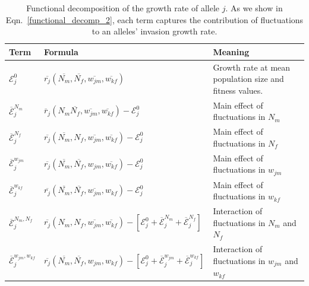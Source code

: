 \documentclass[12pt]{article}
\begin{document}
\begin{table}[h]
\fontsize{7}{12}\selectfont %
    \centering
      \caption{Functional decomposition of the growth rate of allele $j$. As we show in Eqn.~\ref{functional_decomp_2}, each term captures the contribution of fluctuations to an alleles' invasion growth rate. }
  \resizebox{\textwidth}{!} {\begin{tabular}{l|l|l}
  \toprule
        Term & Formula & Meaning \\
        \hline
         $\mathcal{E}^{0}_{j}$ & $\overline{r_{j}} (\overline{N_{m}}, \overline{N_{f}}, \overline{w_{jm}}, \overline{w_{kf}})$ & Growth rate at mean population size and fitness values. \\


         $\overline{\mathcal{E}}^{N_{m}}_{j}$ & $\overline{r}_{j}(N_{m} \overline{N_{f}}, \overline{w_{jm}}, \overline{w_{kf}}) - \mathcal{E}^{0}_{j} $ & Main effect of fluctuations in $N_{m}$\\

         $\overline{\mathcal{E}}^{N_{f}}_{j}$ & $ \overline{r_{j}}( \overline{N_{m}}, N_{f},\overline{w_{jm}}, \overline{w_{kf}}) - \mathcal{E}^{0}_{j}$ & Main effect of fluctuations in $N_{f}$ \\

        $\overline{\mathcal{E}}^{w_{jm}}_{j}$ & $ \overline{r_{j}}(\overline{N_{m}}, \overline{N_{f}}, w_{jm}, \overline{w_{kf}}) - \mathcal{E}^{0}_{j}$& Main effect of fluctuations in $w_{jm}$\\

        $\overline{\mathcal{E}}^{w_{kf}}_{j}$ & $ \overline{r_{j}}(\overline{N_{m}}, \overline{N_{f}}, \overline{w_{jm}}, w_{kf})- \mathcal{E}^{0}_{j}$ & Main effect of fluctuations in $w_{kf}$\\

        $\overline{\mathcal{E}}^{N_{m},N_{f}}_{j}$ & $ \overline{r_{j}}(N_{m}, N_{f}, \overline{w_{jm}}, \overline{w_{kf}})- [\mathcal{E}^{0}_{j} +\overline{\mathcal{E}}^{N_{m}}_{j}+\overline{\mathcal{E}}^{N_{f}}_{j}]$ & Interaction of fluctuations in $N_{m}$ and $N_{f}$\\

        $\overline{\mathcal{E}}^{w_{jm},w_{kf}}_{j}$ & $ \overline{r_{j}}(\overline{N_{m}}, \overline{N_{f}}, w_{jm}, w_{kf})- [\mathcal{E}^{0}_{j} +\overline{\mathcal{E}}^{w_{jm}}_j+\overline{\mathcal{E}}^{w_{kf}}_{j}]$ & Interaction of fluctuations in $w_{jm}$ and $w_{kf}$ \\


\end{tabular}}
\end{table}
\end{document}
